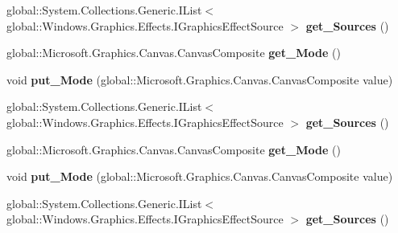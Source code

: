 \begin{DoxyCompactItemize}
global\+::\+System.\+Collections.\+Generic.\+I\+List$<$ global\+::\+Windows.\+Graphics.\+Effects.\+I\+Graphics\+Effect\+Source $>$ {\bfseries get\+\_\+\+Sources} ()
\item 
\mbox{\label{interface_microsoft_1_1_graphics_1_1_canvas_1_1_effects_1_1_i_composite_effect_ae3372d28e3699244792f9afa5b3c65da}} 
global\+::\+Microsoft.\+Graphics.\+Canvas.\+Canvas\+Composite {\bfseries get\+\_\+\+Mode} ()
\item 
\mbox{\label{interface_microsoft_1_1_graphics_1_1_canvas_1_1_effects_1_1_i_composite_effect_ae326ed4a8b61faadbb95fe6c97752e31}} 
void {\bfseries put\+\_\+\+Mode} (global\+::\+Microsoft.\+Graphics.\+Canvas.\+Canvas\+Composite value)
\item 
\mbox{\label{interface_microsoft_1_1_graphics_1_1_canvas_1_1_effects_1_1_i_composite_effect_a743a41c08cbc74d9951adf84ceaf101a}} 
global\+::\+System.\+Collections.\+Generic.\+I\+List$<$ global\+::\+Windows.\+Graphics.\+Effects.\+I\+Graphics\+Effect\+Source $>$ {\bfseries get\+\_\+\+Sources} ()
\item 
\mbox{\label{interface_microsoft_1_1_graphics_1_1_canvas_1_1_effects_1_1_i_composite_effect_ae3372d28e3699244792f9afa5b3c65da}} 
global\+::\+Microsoft.\+Graphics.\+Canvas.\+Canvas\+Composite {\bfseries get\+\_\+\+Mode} ()
\item 
\mbox{\label{interface_microsoft_1_1_graphics_1_1_canvas_1_1_effects_1_1_i_composite_effect_ae326ed4a8b61faadbb95fe6c97752e31}} 
void {\bfseries put\+\_\+\+Mode} (global\+::\+Microsoft.\+Graphics.\+Canvas.\+Canvas\+Composite value)
\item 
\mbox{\label{interface_microsoft_1_1_graphics_1_1_canvas_1_1_effects_1_1_i_composite_effect_a743a41c08cbc74d9951adf84ceaf101a}} 
global\+::\+System.\+Collections.\+Generic.\+I\+List$<$ global\+::\+Windows.\+Graphics.\+Effects.\+I\+Graphics\+Effect\+Source $>$ {\bfseries get\+\_\+\+Sources} ()

\end{DoxyCompactItemize}
